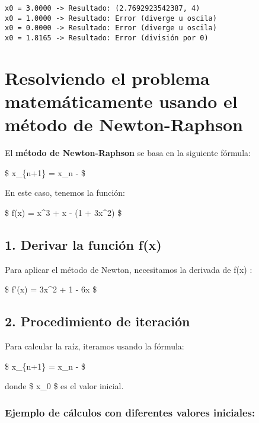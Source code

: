 \documentclass[
  letterpaper,
  DIV=11,
  numbers=noendperiod]{scrartcl}
\begin{document}
\begin{verbatim}
x0 = 3.0000 -> Resultado: (2.7692923542387, 4)
x0 = 1.0000 -> Resultado: Error (diverge u oscila)
x0 = 0.0000 -> Resultado: Error (diverge u oscila)
x0 = 1.8165 -> Resultado: Error (división por 0)
\end{verbatim}

\section{Resolviendo el problema matemáticamente usando el método de
Newton-Raphson}\label{resolviendo-el-problema-matemuxe1ticamente-usando-el-muxe9todo-de-newton-raphson}

El \textbf{método de Newton-Raphson} se basa en la siguiente fórmula:

\$ x\_\{n+1\} = x\_n -  \$

En este caso, tenemos la función:

\$ f(x) = x\^{}3 + x - (1 + 3x\^{}2) \$

\subsection{1. Derivar la función f(x)}\label{derivar-la-funciuxf3n-fx}

Para aplicar el método de Newton, necesitamos la derivada de f(x) :

\$ f'(x) = 3x\^{}2 + 1 - 6x \$

\subsection{2. Procedimiento de
iteración}\label{procedimiento-de-iteraciuxf3n}

Para calcular la raíz, iteramos usando la fórmula:

\$ x\_\{n+1\} = x\_n -  \$

donde \$ x\_0 \$ es el valor inicial.

\subsubsection{Ejemplo de cálculos con diferentes valores
iniciales:}\label{ejemplo-de-cuxe1lculos-con-diferentes-valores-iniciales}
\end{document}
